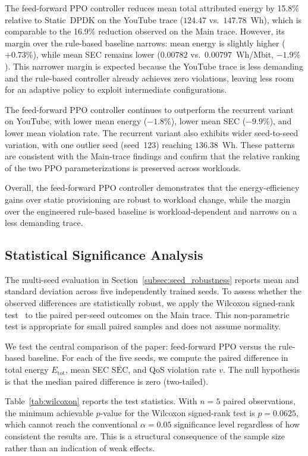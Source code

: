 \documentclass[a4paper,fleqn]{cas-sc}
\begin{document}
The feed-forward PPO controller reduces mean total attributed energy by 15.8\% relative to Static~DPDK on the YouTube trace ($124.47$ vs.\ $147.78$~Wh), which is comparable to the 16.9\% reduction observed on the Main trace. However, its margin over the rule-based baseline narrows: mean energy is slightly higher ($+0.73\%$), while mean SEC remains lower ($0.00782$ vs.\ $0.00797$~Wh/Mbit, $-1.9\%$). This narrower margin is expected because the YouTube trace is less demanding and the rule-based controller already achieves zero violations, leaving less room for an adaptive policy to exploit intermediate configurations.

The feed-forward PPO controller continues to outperform the recurrent variant on YouTube, with lower mean energy ($-1.8\%$), lower mean SEC ($-9.9\%$), and lower mean violation rate. The recurrent variant also exhibits wider seed-to-seed variation, with one outlier seed (seed~123) reaching $136.38$~Wh. These patterns are consistent with the Main-trace findings and confirm that the relative ranking of the two PPO parameterizations is preserved across workloads.

Overall, the feed-forward PPO controller demonstrates that the energy-efficiency gains over static provisioning are robust to workload change, while the margin over the engineered rule-based baseline is workload-dependent and narrows on a less demanding trace.

\subsection{Statistical Significance Analysis}
\label{subsec:stat_significance}

The multi-seed evaluation in Section~\ref{subsec:seed_robustness} reports mean and standard deviation across five independently trained seeds. To assess whether the observed differences are statistically robust, we apply the Wilcoxon signed-rank test~\cite{wilcoxon1945individual} to the paired per-seed outcomes on the Main trace. This non-parametric test is appropriate for small paired samples and does not assume normality.

We test the central comparison of the paper: feed-forward PPO versus the rule-based baseline. For each of the five seeds, we compute the paired difference in total energy $E_{\mathrm{tot}}$, mean SEC $\overline{\mathrm{SEC}}$, and QoS violation rate $v$. The null hypothesis is that the median paired difference is zero (two-tailed).

Table~\ref{tab:wilcoxon} reports the test statistics. With $n=5$ paired observations, the minimum achievable $p$-value for the Wilcoxon signed-rank test is $p=0.0625$, which cannot reach the conventional $\alpha=0.05$ significance level regardless of how consistent the results are. This is a structural consequence of the sample size rather than an indication of weak effects.
\end{document}
